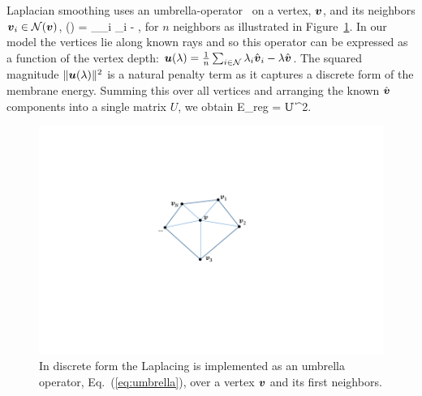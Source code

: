 Laplacian smoothing uses an umbrella-operator~\cite{Kobbelt:1998} on a vertex, $\boldsymbol{v}$, and its neighbors $\boldsymbol{v}_i\in\mathcal{N}(\boldsymbol{v})$,
\beq
{}(\vertex) = \sum_{\vertex_i\in{}} \vertex_i - \vertex,\label{eq:umbrella}
\eeq
for $n$ neighbors as illustrated in Figure~\ref{fig:laplacian}.  In our model the vertices lie along known rays and so this operator can be expressed as a function of the vertex depth: $\boldsymbol{u}(\lambda) = \frac{1}{n}\sum_{i\in\mathcal{N}} \lambda_i \hat{\boldsymbol{v}}_i - \lambda\hat{\boldsymbol{v}}$.  The squared magnitude $\|\boldsymbol{u}(\lambda)\|^2$ is a natural penalty term as it captures a discrete form of the membrane energy.  Summing this over all vertices and arranging the known $\hat{\boldsymbol{v}}$ components into a single matrix $U$, we obtain
\beq
E_{reg} = \| U \vlambda \|^2.
\eeq

\begin{figure}
\begin{center}
   \includegraphics[trim=100 110 140 90,clip,width=0.9\linewidth]{Figures/LaplacianFacets}
\end{center}
   \caption{In discrete form the Laplacing is implemented as an umbrella operator, Eq.~(\ref{eq:umbrella}), over a vertex $\boldsymbol{v}$ and its first neighbors.}
\label{fig:laplacian}
\end{figure}


